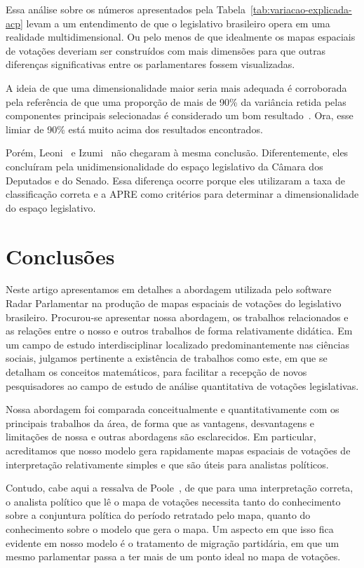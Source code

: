 \documentclass[
	article,			%
	12pt,				%
	oneside,			%
	a4paper,			%
	english,			%
	brazil,				%
	sumario=tradicional,
	oldfontcommands %
	]{abntex2}
\begin{document}
Essa análise sobre os números apresentados pela Tabela~\ref{tab:variacao-explicada-acp} levam a um entendimento de que o legislativo brasileiro opera em uma realidade multidimensional. Ou pelo menos de que idealmente os mapas espaciais de votações deveriam ser construídos com mais dimensões para que outras diferenças significativas entre os parlamentares fossem visualizadas. 

A ideia de que uma dimensionalidade maior seria mais adequada é corroborada pela referência de que uma proporção de mais de 90\% da variância retida pelas componentes principais selecionadas é considerado um bom resultado~\cite{DataMining2003}. Ora, esse limiar de 90\% está muito acima dos resultados encontrados.

Porém, Leoni~\cite{leoni02cdep} e Izumi~\cite{izumi2016senado} não chegaram à mesma conclusão. Diferentemente, eles concluíram pela unidimensionalidade do espaço legislativo da Câmara dos Deputados e do Senado. Essa diferença ocorre porque eles utilizaram a taxa de classificação correta e a APRE como critérios para determinar a dimensionalidade do espaço legislativo.

\section{Conclusões}
\label{sec:conclusoes}

Neste artigo apresentamos em detalhes a abordagem utilizada pelo software Radar Parlamentar na produção de mapas espaciais de votações do legislativo brasileiro. Procurou-se apresentar nossa abordagem, os trabalhos relacionados e as relações entre o nosso e outros trabalhos de forma relativamente didática. Em um campo de estudo interdisciplinar localizado predominantemente nas ciências sociais, julgamos pertinente a existência de trabalhos como este, em que se detalham os conceitos matemáticos, para facilitar a recepção de novos pesquisadores ao campo de estudo de análise quantitativa de votações legislativas.

Nossa abordagem foi comparada conceitualmente e quantitativamente com os principais trabalhos da área, de forma que as vantagens, desvantagens e limitações de nossa e outras abordagens são esclarecidos. Em particular, acreditamos que nosso modelo gera rapidamente mapas espaciais de votações de interpretação relativamente simples e que são úteis para analistas políticos.

Contudo, cabe aqui a ressalva de Poole~\cite{poole2005book}, de que para uma interpretação correta, o analista político que lê o mapa de votações necessita tanto do conhecimento sobre a conjuntura política do período retratado pelo mapa, quanto do conhecimento sobre o modelo que gera o mapa. Um aspecto em que isso fica evidente em nosso modelo é o tratamento de migração partidária, em que um mesmo parlamentar passa a ter mais de um ponto ideal no mapa de votações.
\end{document}
